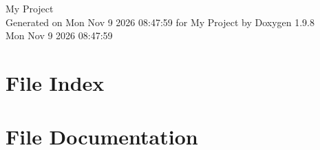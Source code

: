 \documentclass[twoside]{book}
\newcommand{\+}{\discretionary{\mbox{\scriptsize$\hookleftarrow$}}{}{}}
\newcommand{\clearemptydoublepage}{%
    \newpage{\pagestyle{empty}\cleardoublepage}%
  }
\begin{document}
  \raggedbottom
    \hypersetup{pageanchor=false,
                bookmarksnumbered=true,
                pdfencoding=unicode
               }
  \begin{titlepage}
  \vspace*{7cm}
  \begin{center}%
  {\Large My Project}\\
  \vspace*{1cm}
  {\large Generated on Mon Nov 9 2026 08\+:47\+:59 for My Project by Doxygen 1.9.8}\\
    \vspace*{0.5cm}
    {\small Mon Nov 9 2026 08:47:59}
  \end{center}
  \end{titlepage}
  \clearemptydoublepage
  \tableofcontents
  \clearemptydoublepage
  \hypersetup{pageanchor=true}

\chapter{File Index}

\chapter{File Documentation}


  \backmatter
  \newpage
  \clearemptydoublepage
  \printindex
\end{document}
